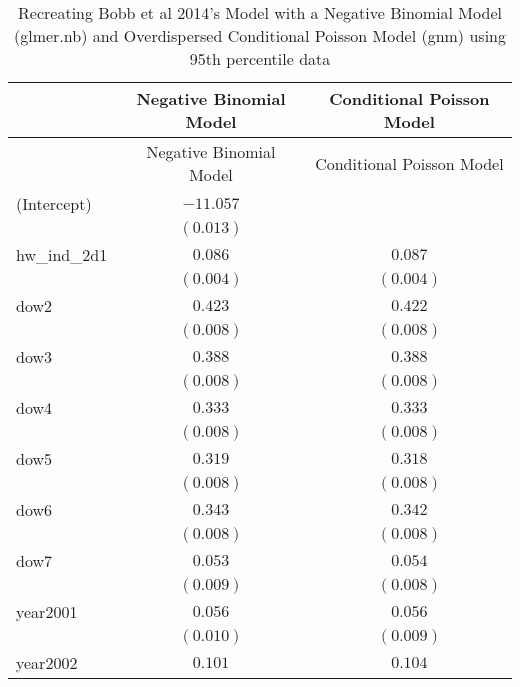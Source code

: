 
\begin{center}
\begin{longtable}{l c c}
\caption{Recreating Bobb et al 2014's Model with a Negative Binomial Model (glmer.nb) and Overdispersed Conditional Poisson Model (gnm) using 95th percentile data}
\label{bobb_comparisons_95th_perct}\\
\hline
 & Negative Binomial Model & Conditional Poisson Model \\
\hline
\endfirsthead
\hline
 & Negative Binomial Model & Conditional Poisson Model \\
\hline
\endhead
\hline
\endfoot
\hline
\endlastfoot
(Intercept)           & $-11.057$     &                       \\
                      & $(0.013)$     &                       \\
hw\_ind\_2d1          & $0.086$       & $0.087$               \\
                      & $(0.004)$     & $(0.004)$             \\
dow2                  & $0.423$       & $0.422$               \\
                      & $(0.008)$     & $(0.008)$             \\
dow3                  & $0.388$       & $0.388$               \\
                      & $(0.008)$     & $(0.008)$             \\
dow4                  & $0.333$       & $0.333$               \\
                      & $(0.008)$     & $(0.008)$             \\
dow5                  & $0.319$       & $0.318$               \\
                      & $(0.008)$     & $(0.008)$             \\
dow6                  & $0.343$       & $0.342$               \\
                      & $(0.008)$     & $(0.008)$             \\
dow7                  & $0.053$       & $0.054$               \\
                      & $(0.009)$     & $(0.008)$             \\
year2001              & $0.056$       & $0.056$               \\
                      & $(0.010)$     & $(0.009)$             \\
year2002              & $0.101$       & $0.104$               \\

\end{longtable}
\end{center}
